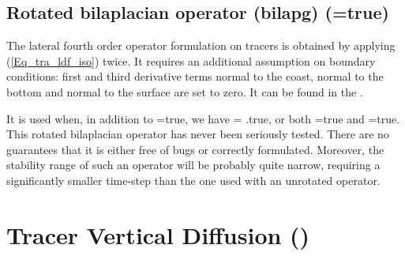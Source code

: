 \subsection   [Rotated bilaplacian operator (bilapg) (\np{ln\_traldf\_bilap})]
			{Rotated bilaplacian operator (bilapg) (=true)}
\label{TRA_ldf_bilapg}

The lateral fourth order operator formulation on tracers is obtained by 
applying (\ref{Eq_tra_ldf_iso}) twice. It requires an additional assumption 
on boundary conditions: first and third derivative terms normal to the 
coast, normal to the bottom and normal to the surface are set to zero. It can be found in the
.

It is used when, in addition to =true, we have 
= .true, or both =true and =true. 
This rotated bilaplacian operator has never been seriously 
tested. There are no guarantees that it is either free of bugs or correctly formulated. 
Moreover, the stability range of such an operator will be probably quite 
narrow, requiring a significantly smaller time-step than the one used with an
unrotated operator.

\section  [Tracer Vertical Diffusion (\textit{trazdf})]
		{Tracer Vertical Diffusion ()}
\label{TRA_zdf}

